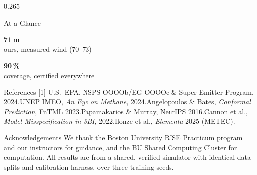 \documentclass[final]{beamer}
\begin{document}
\begin{frame}[t]
\begin{columns}[t]
\begin{column}{0.265\linewidth}
\begin{pbox}{At a Glance}
\vspace{7mm}
\begin{minipage}{0.47\linewidth}\centering
  {\color{navy}\bfseries\Huge 71\,m}\\[1mm]
  {\small ours, measured wind (70--73)}
\end{minipage}\hfill
\begin{minipage}{0.47\linewidth}\centering
  {\color{navy}\bfseries\Huge 90\,\%}\\[1mm]
  {\small coverage, certified everywhere}
\end{minipage}
\end{pbox}

\vspace{10mm}

\begin{pbox}{References}
\small
[1] U.S.\ EPA, NSPS OOOOb/EG OOOOc \& Super-Emitter Program, 2024.\quad
[2] UNEP IMEO, \emph{An Eye on Methane}, 2024.\quad
[3] Angelopoulos \& Bates, \emph{Conformal Prediction}, FnTML 2023.\quad
[4] Papamakarios \& Murray, NeurIPS 2016.\quad
[5] Cannon et al., \emph{Model Misspecification in SBI}, 2022.\quad
[6] Ilonze et al., \emph{Elementa} 2025 (METEC).
\end{pbox}

\vspace{10mm}

\begin{pbox}{Acknowledgements}
\small We thank the Boston University RISE Practicum program and our
instructors for guidance, and the BU Shared Computing Cluster for
computation. All results are from a shared, verified simulator with
identical data splits and calibration harness, over three training
seeds.
\end{pbox}

\end{column}
\end{columns}

\end{frame}
\end{document}
